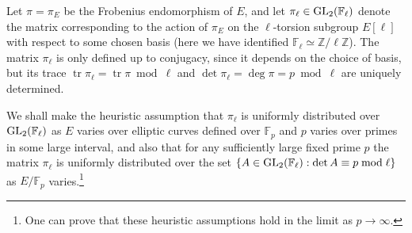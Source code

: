\documentclass[11pt]{article}
\newcommand{\Fl}{\mathbb{F}_\ell}
\newcommand{\Fp}{\mathbb{F}_p}
\newcommand{\Z}{\mathbb{Z}}
\newcommand{\GL}{{\rm GL}}
\newcommand{\tr}{\operatorname{tr}}
\begin{document}
Let $\pi=\pi_E$ be the Frobenius endomorphism of $E$, and let $\pi_\ell\in \GL_2(\Fl)$ denote the matrix corresponding to the action of $\pi_E$ on the $\ell$-torsion subgroup $E[\ell]$ with respect to some chosen basis (here we have identified $\Fl\simeq \Z/\ell\Z$).
The matrix $\pi_\ell$ is only defined up to conjugacy, since it depends on the choice of basis,  but its trace $\tr \pi_\ell = \tr \pi\bmod\ell$ and $\det\pi_\ell = \deg \pi = p\bmod \ell$ are uniquely determined.

We shall make the heuristic assumption that $\pi_\ell$ is uniformly distributed over $\GL_2(\Fl)$ as $E$ varies over elliptic curves defined over $\Fp$ and $p$ varies over primes in some large interval, and also that for any sufficiently large fixed prime $p$ the matrix $\pi_\ell$ is uniformly distributed over the set $\{A\in \GL_2(\Fl):\det A\equiv p\bmod\ell\}$ as $E/\Fp$ varies.\footnote{One can prove that these heuristic assumptions hold in the limit as $p\to \infty$.}
\end{document}
